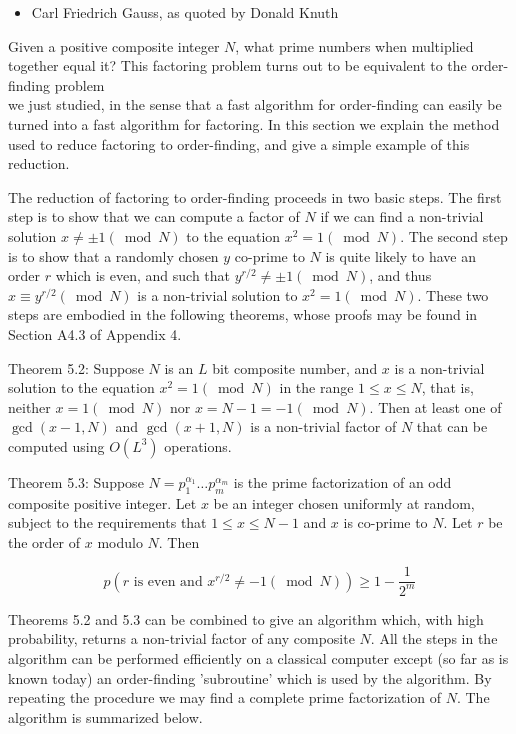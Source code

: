 \begin{itemize}
  \item Carl Friedrich Gauss, as quoted by Donald Knuth
\end{itemize}

Given a positive composite integer $N$, what prime numbers when multiplied together equal it? This factoring problem turns out to be equivalent to the order-finding problem\\
we just studied, in the sense that a fast algorithm for order-finding can easily be turned into a fast algorithm for factoring. In this section we explain the method used to reduce factoring to order-finding, and give a simple example of this reduction.

The reduction of factoring to order-finding proceeds in two basic steps. The first step is to show that we can compute a factor of $N$ if we can find a non-trivial solution $x \neq \pm 1(\bmod N)$ to the equation $x^{2}=1(\bmod N)$. The second step is to show that a randomly chosen $y$ co-prime to $N$ is quite likely to have an order $r$ which is even, and such that $y^{r / 2} \neq \pm 1(\bmod N)$, and thus $x \equiv y^{r / 2}(\bmod N)$ is a non-trivial solution to $x^{2}=1(\bmod N)$. These two steps are embodied in the following theorems, whose proofs may be found in Section A4.3 of Appendix 4.

Theorem 5.2: Suppose $N$ is an $L$ bit composite number, and $x$ is a non-trivial solution to the equation $x^{2}=1(\bmod N)$ in the range $1 \leq x \leq N$, that is, neither $x=1(\bmod N)$ nor $x=N-1=-1(\bmod N)$. Then at least one of $\operatorname{gcd}(x-1, N)$ and $\operatorname{gcd}(x+1, N)$ is a non-trivial factor of $N$ that can be computed using $O\left(L^{3}\right)$ operations.

Theorem 5.3: Suppose $N=p_{1}^{\alpha_{1}} \ldots p_{m}^{\alpha_{m}}$ is the prime factorization of an odd composite positive integer. Let $x$ be an integer chosen uniformly at random, subject to the requirements that $1 \leq x \leq N-1$ and $x$ is co-prime to $N$. Let $r$ be the order of $x$ modulo $N$. Then

\begin{equation*}
p\left(r \text { is even and } x^{r / 2} \neq-1(\bmod N)\right) \geq 1-\frac{1}{2^{m}} \tag{5.60}
\end{equation*}

Theorems 5.2 and 5.3 can be combined to give an algorithm which, with high probability, returns a non-trivial factor of any composite $N$. All the steps in the algorithm can be performed efficiently on a classical computer except (so far as is known today) an order-finding 'subroutine' which is used by the algorithm. By repeating the procedure we may find a complete prime factorization of $N$. The algorithm is summarized below.

